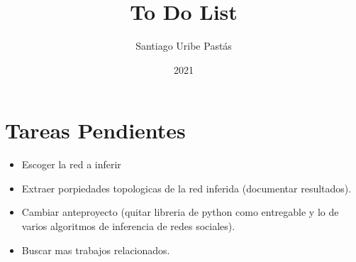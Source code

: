 \documentclass{article}
\title{To Do List}
\author{Santiago Uribe Pastás}
\date{2021}
\begin{document}
\maketitle

\section{Tareas Pendientes}
\begin{itemize}
    \item Escoger la red a inferir
    \item Extraer porpiedades topologicas de la red inferida (documentar resultados).
    \item Cambiar anteproyecto (quitar libreria de python como entregable y lo de varios algoritmos de inferencia de redes sociales).
    \item Buscar mas trabajos relacionados.
\end{itemize}
\end{document}
